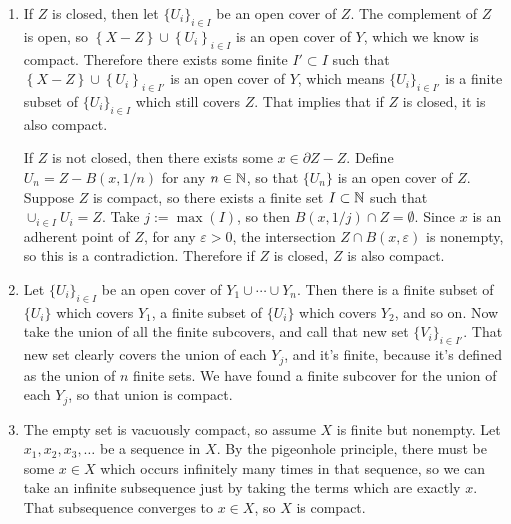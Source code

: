 \documentclass{article}
\begin{document}
\begin{enumerate}[label=(\alph*)]
    \item If $Z$ is closed, then let $\{U_i\}_{i \in I}$ be an open cover of $Z$. The complement of $Z$ is open, so $ \left\{ X-Z \right\} \cup \left\{ U_i \right\}_{i \in I}$ is an open cover of $Y$, which we know is compact. Therefore there exists some finite $I' \subset I$ such that $ \left\{ X-Z \right\} \cup \left\{ U_i \right\}_{i \in I'}$ is an open cover of $Y$, which means $\{U_i\}_{i \in I'}$ is a finite subset of $\{U_i\}_{i \in I}$ which still covers $Z$. That implies that if $Z$ is closed, it is also compact.
        \par
        If $Z$ is not closed, then there exists some $x \in \partial Z - Z$. Define $U_n = Z - B(x, 1/n)$ for any $n \in \mathbb{N}$, so that $\{U_n\}$ is an open cover of $Z$. Suppose $Z$ is compact, so there exists a finite set $I \subset \mathbb{N}$ such that $\cup_{i \in I} U_i = Z$. Take $j := \max(I)$, so then $B(x, 1/j) \cap Z = \emptyset$. Since $x$ is an adherent point of $Z$, for any $\varepsilon > 0$, the intersection $Z \cap B(x, \varepsilon)$ is nonempty, so this is a contradiction. Therefore if $Z$ is closed, $Z$ is also compact.
    \item Let $\{U_i\}_{i \in I}$ be an open cover of $Y_1 \cup \cdots \cup Y_n$. Then there is a finite subset of $\{U_i\}$ which covers $Y_1$, a finite subset of $\{U_i\}$ which covers $Y_2$, and so on. Now take the union of all the finite subcovers, and call that new set $\{V_i\}_{i \in I'}$. That new set clearly covers the union of each $Y_j$, and it's finite, because it's defined as the union of $n$ finite sets. We have found a finite subcover for the union of each $Y_j$, so that union is compact.
    \item The empty set is vacuously compact, so assume $X$ is finite but nonempty. Let $x_1, x_2, x_3, \dots$ be a sequence in $X$. By the pigeonhole principle, there must be some $x \in X$ which occurs infinitely many times in that sequence, so we can take an infinite subsequence just by taking the terms which are exactly $x$. That subsequence converges to $x \in X$, so $X$ is compact.
\end{enumerate}
\end{document}
